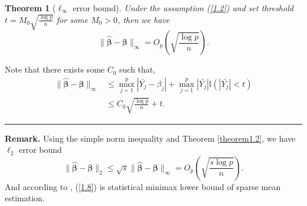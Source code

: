 \documentclass[12pt]{article}
\numberwithin{equation}{section}
\newtheorem{theorem}{Theorem}[section]
\newenvironment{proof}{{\bf Proof:}}{\hfill\rule{2mm}{2mm}}
\begin{document}
\begin{theorem}[$\ell_{\infty}$ error bound]
	Under the assumption (\ref{1.2}) and set threshold $t=M_0\sqrt{\frac{\log p}{n}}$ for some $M_0>0$, then we have
	\begin{equation}
	\|\boldsymbol{\widehat\beta}-\boldsymbol{\beta}\|_{\infty}=O_p\left(\sqrt{\frac{\log p}{n}}\right).
	\end{equation}
\end{theorem}
\begin{proof}
	Note that there exists some $C_0$ such that,
	\begin{align*}
	\|\boldsymbol{\widehat\beta}-\boldsymbol{\beta}\|_{\infty}&\leq \max_{j=1}^p\left|\bar{Y_j}-\beta_{j}\right|+\max_{j=1}^p\left|\bar{Y_j}\right|\mathbb{I}\left(|\bar{Y_j}|<t\right)\\
	&\leq  C_0\sqrt{\frac{\log p}{n}}+t.
	\end{align*}
\end{proof}\newline
\textbf{Remark. }Using the simple norm inequality and Theorem \ref{theorem1.2}, we have $\ell_2$ error bound
\begin{equation}\label{1.8}
 \|\boldsymbol{\widehat\beta}-\boldsymbol{\beta}\|_{2}\leq \sqrt{s}\|\boldsymbol{\widehat\beta}-\boldsymbol{\beta}\|_{\infty}=O_p\left(\sqrt{\frac{s\log p}{n}}\right).
\end{equation}
 And according to \citet{Johnstone1986}, (\ref{1.8}) is statistical minimax lower bound of sparse mean estimation.
\end{document}

